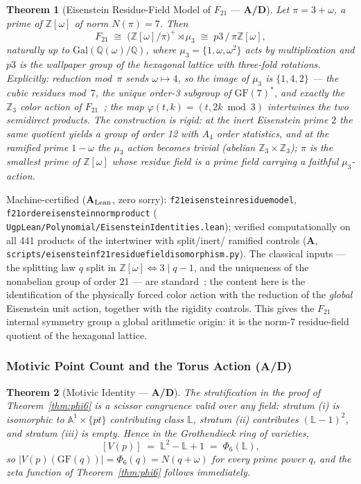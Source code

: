 \documentclass[11pt]{article}
\newtheorem{theorem}{Theorem}[section]
\theoremstyle{remark}
\newcommand{\GF}[1]{\ensuremath{\mathrm{GF}(#1)}}
\newcommand{\lean}[1]{%
  \penalty-100
  \begingroup\def\_{\textunderscore\allowbreak}\texttt{#1}\endgroup}
\newcommand{\CatA}{\textbf{A}}
\newcommand{\CatAL}{\texorpdfstring{\ensuremath{\textbf{A}_{\rm Lean}}}{A-Lean}}
\newcommand{\CatAD}{\textbf{A/D}}
\begin{document}
\begin{theorem}[Eisenstein Residue-Field Model of $F_{21}$ --- \CatAD{}]
\label{thm:f21eisenstein}
Let $\pi = 3 + \omega$, a prime of $\mathbb{Z}[\omega]$ of norm
$N(\pi) = 7$. Then
\[
  F_{21} \;\cong\; \bigl(\mathbb{Z}[\omega]/\pi\bigr)^{+} \rtimes \mu_3
  \;\cong\; p3\,/\,\pi\mathbb{Z}[\omega],
\]
naturally up to $\mathrm{Gal}(\mathbb{Q}(\omega)/\mathbb{Q})$, where $\mu_3 =
\{1,\omega,\omega^2\}$ acts by multiplication and $p3$ is the wallpaper
group of the hexagonal lattice with three-fold rotations. Explicitly:
reduction mod~$\pi$ sends $\omega \mapsto 4$, so the image of $\mu_3$ is
$\{1, 4, 2\}$ --- the cubic residues mod~$7$, the unique order-3 subgroup
of $\GF{7}^*$, and exactly the $\mathbb{Z}_3$ color action of
$F_{21}$~\cite{SpivackGTECompleteFramework}; the map
$\varphi(t,k) = (t, 2k \bmod 3)$ intertwines the two semidirect products.
The construction is rigid: at the inert Eisenstein prime $2$ the same
quotient yields a group of order 12 with $A_4$ order statistics, and at the
ramified prime $1 - \omega$ the $\mu_3$ action becomes trivial (abelian
$\mathbb{Z}_3 \times \mathbb{Z}_3$); $\pi$ is the smallest prime of
$\mathbb{Z}[\omega]$ whose residue field is a prime field carrying a
faithful $\mu_3$-action.
\end{theorem}

Machine-certified (\CatAL{}, zero sorry):
\lean{f21\_eisenstein\_residue\_model},
\lean{f21\_order\_eisenstein\_norm\_product}
(\lean{UgpLean/Polynomial/EisensteinIdentities.lean}); verified
computationally on all 441 products of the intertwiner with split/inert/%
ramified controls
(\CatA{}, \lean{scripts/eisenstein\_f21\_residue\_field\_isomorphism.py}).
The classical inputs --- the splitting law $q$ split in
$\mathbb{Z}[\omega] \iff 3 \mid q - 1$, and the uniqueness of the nonabelian
group of order 21 --- are standard~\cite{IrelandRosen1990}; the content here
is the identification of the physically forced color action with the
reduction of the \emph{global} Eisenstein unit action, together with the
rigidity controls. This gives the $F_{21}$ internal symmetry group a global
arithmetic origin: it is the norm-7 residue-field quotient of the hexagonal
lattice.

\subsubsection{Motivic Point Count and the Torus Action (\CatAD{})}

\begin{theorem}[Motivic Identity --- \CatAD{}]
\label{thm:motivic}
The stratification in the proof of Theorem~\ref{thm:phi6} is a scissor
congruence valid over any field: stratum (i) is isomorphic to
$\mathbb{A}^1 \times \{pt\}$ contributing class $\mathbb{L}$, stratum (ii)
contributes $(\mathbb{L}-1)^2$, and stratum (iii) is empty. Hence in the
Grothendieck ring of varieties,
\[
  [V(p)] \;=\; \mathbb{L}^2 - \mathbb{L} + 1 \;=\; \Phi_6(\mathbb{L}),
\]
so $|V(p)(\GF{q})| = \Phi_6(q) = N(q + \omega)$ for \emph{every} prime power
$q$, and the zeta function of Theorem~\ref{thm:phi6} follows immediately.
\end{theorem}
\end{document}
